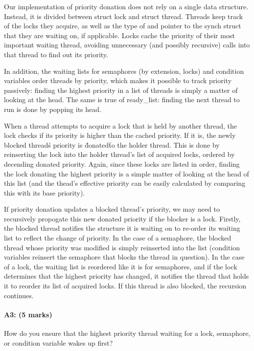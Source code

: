 Our implementation of priority donation does not rely on a single data structure. Instead, it is divided between struct lock and struct thread. Threads keep track of the locks they acquire, as well as the type of and pointer to the synch struct that they are waiting on, if applicable. Locks cache the priority of their most important waiting thread, avoiding unnecessary (and possibly recursive) calls into that thread to find out its priority.

In addition, the waiting lists for semaphores (by extension, locks) and condition variables order threads by priority, which makes it possible to track priority passively: finding the highest priority in a list of threads is simply a matter of looking at the head. The same is true of ready_list: finding the next thread to run is done by popping its head.

When a thread attempts to acquire a lock that is held by another thread, the lock checks if its priority is higher than the cached priority. If it is, the newly blocked thread\'s priority is \"donated\" to the holder thread. This is done by reinserting the lock into the holder thread's list of acquired locks, ordered by decending donated priority. Again, since these locks are listed in order, finding the lock donating the highest priority is a simple matter of looking at the head of this list (and the thead's effective priority can be easily calculated by comparing this with its base priority).

If priority donation updates a blocked thread's priority, we may need to recursively propogate this new donated priority if the blocker is a lock. Firstly, the blocked thread notifies the structure it is waiting on to re-order its waiting list to reflect the change of priority.
In the case of a semaphore, the blocked thread whose priority was modified is simply reinserted into the list (condition variables reinsert the semaphore that blocks the thread in question).
In the case of a lock, the waiting list is reordered like it is for semaphores, and if the lock determines that the highest priority has changed, it notifies the thread that holds it to reorder its list of acquired locks. If this thread is also blocked, the recursion continues.

\paragraph{A3: (5 marks)}
How do you ensure that the highest priority thread waiting for a lock, semaphore, or condition variable wakes up first?

